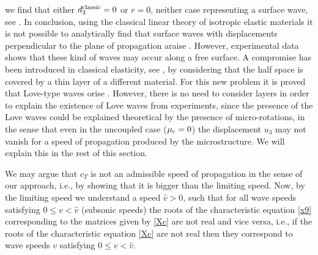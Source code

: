 \documentclass[10pt]{article}
\begin{document}
we find that either $d_3^{\rm classic}=0$ or $r=0$, neither case representing a surface wave, see \cite[page 219]{Achenbach}. In conclusion, using the classical linear theory of isotropic  elastic materials it is not possible to analytically find  that surface waves with displacements perpendicular to the plane of propagation araise \cite{Achenbach}. However, experimental data shows that these kind of waves may occur along a free surface. A compromise has been introduced in classical elasticity, see \cite[page 219]{Achenbach}, by considering that the half space is covered by a thin layer of a different material. For this new problem it is proved that Love-type waves orise \cite[page 219]{Achenbach}. However, there is no need to consider layers in order to explain the existence of Love waves from experiments, since the presence of the Love waves could be explained theoretical by the presence of micro-rotations, in the sense that even in the uncoupled case ($\mu_{\rm c}=0$) the displacement $u_3$ may not vanish for a speed of propagation produced by the microstructure. We will explain this in the rest of this section.

We may argue that $c_T$ is not an admissible speed of propagation in the sense of our approach, i.e., by showing that it is bigger than the limiting speed. Now, 	by the {limiting speed} we understand a speed $\widehat{v}>0$, such that for all wave speeds satisfying 	$0\le v<\widehat{v}$  (subsonic speeds) the roots  of the characteristic equation \eqref{x9} corresponding to the matrices given by \eqref{Xc} are not real and vice versa, i.e., if the roots  of the characteristic equation \eqref{Xc}  are not real then they correspond to wave speeds $v$ satisfying 	$0\le v<\widehat{v}$.
\end{document}
